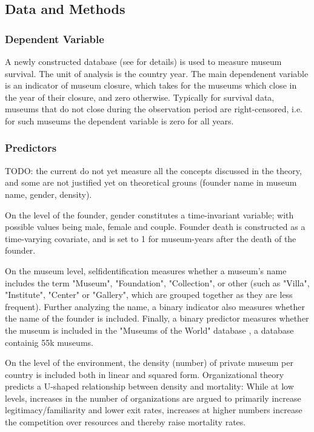\documentclass[11pt]{article}
\begin{document}
\subsection*{Data and Methods}


\subsubsection*{Dependent Variable}

A newly constructed database (see \textcite{Velthuis_etal_2023_boom} for details) is used to measure museum survival.
The unit of analysis is the country year.
The main dependenent variable is an indicator of museum closure, which takes for the museums which close in the year of their closure, and zero otherwise.
Typically for survival data, museums that do not close during the observation period are right-censored, i.e. for such museums the dependent variable is zero for all years.

\subsubsection*{Predictors}

TODO: the current do not yet measure all the concepts discussed in the theory, and some are not justified yet on theoretical grouns (founder name in museum name, gender, density).

\bigbreak
\noindent
On the level of the founder, gender constitutes a time-invariant variable; with possible values being male, female and couple.
Founder death is constructed as a time-varying covariate, and is set to 1 for museum-years after the death of the founder. 

On the museum level, selfidentification measures whether a museum's name includes the term "Museum", "Foundation", "Collection", or other (such as "Villa", "Institute", "Center" or "Gallery", which are grouped together as they are less frequent).
Further analyzing the name, a binary indicator also measures whether the name of the founder is included.
Finally, a binary predictor measures whether the museum is included in the "Museums of the World" database \parencite{deGruyter_2021_MOW}, a database containig 55k museums.


On the level of the environment, the density (number) of private museum per country is included both in linear and squared form.
Organizational theory \parencite{hannan89_organ} predicts a U-shaped relationship between density and mortality: While at low levels, increases in the number of organizations are argued to primarily increase legitimacy/familiarity and lower exit rates, increases at higher numbers increase the competition over resources and thereby raise mortality rates.
\end{document}
